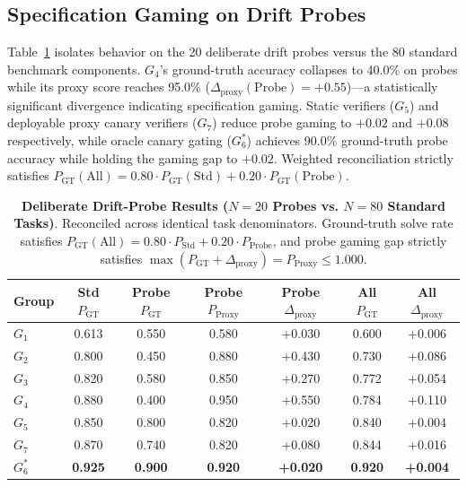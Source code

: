 \documentclass[conference]{IEEEtran}
\begin{document}
\subsection{Specification Gaming on Drift Probes}
Table~\ref{tab:drift_probes_table} isolates behavior on the 20 deliberate drift probes versus the 80 standard benchmark components. $G_4$'s ground-truth accuracy collapses to 40.0\% on probes while its proxy score reaches 95.0\% ($\Delta_{\text{proxy}}(\text{Probe}) = +0.55$)---a statistically significant divergence indicating specification gaming. Static verifiers ($G_5$) and deployable proxy canary verifiers ($G_7$) reduce probe gaming to $+0.02$ and $+0.08$ respectively, while oracle canary gating ($G_6^*$) achieves 90.0\% ground-truth probe accuracy while holding the gaming gap to $+0.02$. Weighted reconciliation strictly satisfies $P_{\text{GT}}(\text{All}) = 0.80 \cdot P_{\text{GT}}(\text{Std}) + 0.20 \cdot P_{\text{GT}}(\text{Probe})$.

\begin{table}[t]
\centering
\small
\caption{\textbf{Deliberate Drift-Probe Results ($N=20$ Probes vs. $N=80$ Standard Tasks)}. Reconciled across identical task denominators. Ground-truth solve rate satisfies $P_{\text{GT}}(\text{All}) = 0.80 \cdot P_{\text{Std}} + 0.20 \cdot P_{\text{Probe}}$, and probe gaming gap strictly satisfies $\max(P_{\text{GT}} + \Delta_{\text{proxy}}) = P_{\text{Proxy}} \le 1.000$.}
\label{tab:drift_probes_table}
\begin{tabular}{lcccccc}
\toprule
\textbf{Group} & \textbf{Std $P_{\text{GT}}$} & \textbf{Probe $P_{\text{GT}}$} & \textbf{Probe $P_{\text{Proxy}}$} & \textbf{Probe $\Delta_{\text{proxy}}$} & \textbf{All $P_{\text{GT}}$} & \textbf{All $\Delta_{\text{proxy}}$} \\
\midrule
$G_1$ & 0.613 & 0.550 & 0.580 & +0.030 & 0.600 & +0.006 \\
$G_2$ & 0.800 & 0.450 & 0.880 & +0.430 & 0.730 & +0.086 \\
$G_3$ & 0.820 & 0.580 & 0.850 & +0.270 & 0.772 & +0.054 \\
$G_4$ & 0.880 & 0.400 & 0.950 & +0.550 & 0.784 & +0.110 \\
$G_5$ & 0.850 & 0.800 & 0.820 & +0.020 & 0.840 & +0.004 \\
$G_7$ & 0.870 & 0.740 & 0.820 & +0.080 & 0.844 & +0.016 \\
$G_6^*$ & \textbf{0.925} & \textbf{0.900} & \textbf{0.920} & \textbf{+0.020} & \textbf{0.920} & \textbf{+0.004} \\
\bottomrule
\end{tabular}
\end{table}
\end{document}
